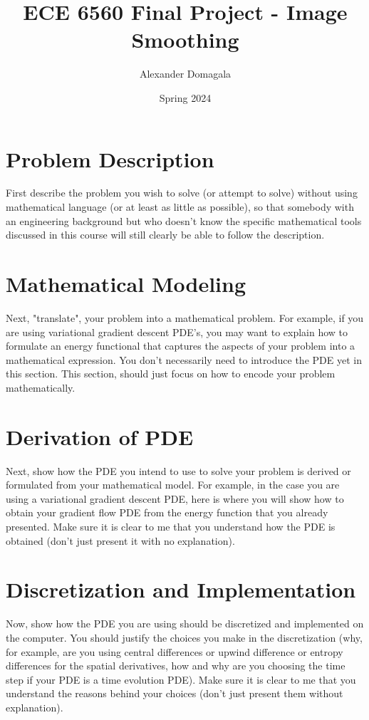 \documentclass{article}
\title{\textbf{ECE 6560 Final Project - Image Smoothing}}
\author{Alexander Domagala}
\date{Spring 2024}
\begin{document}
  \maketitle

  \section{Problem Description}
  First describe the problem you wish to solve (or attempt to solve) without
  using mathematical language (or at least as little as possible), so that
  somebody with an engineering background but who doesn't know the
  specific mathematical tools discussed in this course will still clearly
  be able to follow the description.

  \section{Mathematical Modeling}
  Next, "translate", your problem into a mathematical problem. For example,
  if you are using variational gradient descent PDE's, you may want to explain
  how to formulate an energy functional that captures the aspects of your problem
  into a mathematical expression.  You don't necessarily need to introduce the
  PDE yet in this section. This section, should just focus on how to encode
  your problem mathematically.

  \section{Derivation of PDE}
  Next, show how the PDE you intend to use to solve your problem is derived
  or formulated from your mathematical model. For example, in the case you are
  using a variational gradient descent PDE, here is where you will show how to
  obtain your gradient flow PDE from the energy function that you already
  presented. Make sure it is clear to me that you understand how the PDE is
  obtained (don't just present it with no explanation).

  \section{Discretization and Implementation}
  Now, show how the PDE you are using should be discretized and implemented
  on the computer.  You should justify the choices you make in the discretization
  (why, for example, are you using central differences or upwind difference or
  entropy differences for the spatial derivatives, how and why are you choosing
  the time step if your PDE is a time evolution PDE). Make sure it is clear
  to me that you understand the reasons behind your choices (don't just present
  them without explanation).
\end{document}
